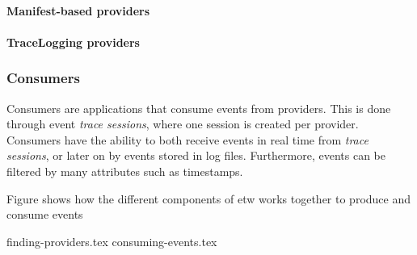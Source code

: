 \documentclass{report}
\begin{document}
\paragraph{Manifest-based providers}

\paragraph{TraceLogging providers}

\subsubsection{Consumers}
Consumers are applications that consume events from providers. This is done through event \emph{trace sessions}, where one session is created per provider. Consumers have the ability to both receive events in real time from \emph{trace sessions}, or later on by events stored in log files. Furthermore, events can be filtered by many attributes such as timestamps.

Figure  shows how the different components of \gls{etw} works together to produce and consume events


{finding-providers.tex}
{consuming-events.tex}

\end{document}

